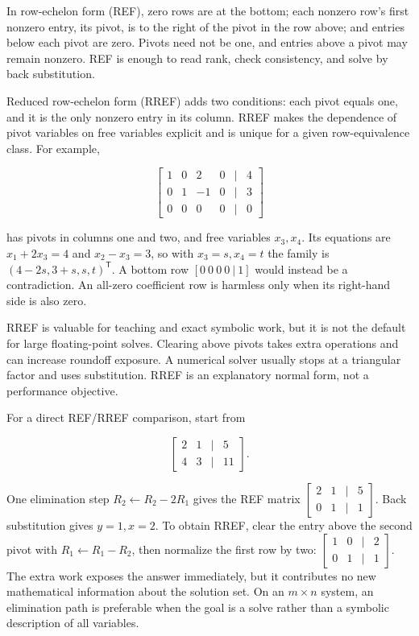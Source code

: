 \hypertarget{01-foundations-i-ch019-ref-and-rref-expose-pivots-and-free-variables}{}

In row-echelon form (REF), zero rows are at the bottom; each nonzero row's first nonzero entry, its pivot, is to the right of the pivot in the row above; and entries below each pivot are zero. Pivots need not be one, and entries above a pivot may remain nonzero. REF is enough to read rank, check consistency, and solve by back substitution.

Reduced row-echelon form (RREF) adds two conditions: each pivot equals one, and it is the only nonzero entry in its column. RREF makes the dependence of pivot variables on free variables explicit and is unique for a given row-equivalence class. For example,

\[
\begin{bmatrix}1&0&2&0&|&4\\0&1&-1&0&|&3\\0&0&0&0&|&0\end{bmatrix}
\]

has pivots in columns one and two, and free variables \(x_3,x_4\). Its equations are \(x_1+2x_3=4\) and \(x_2-x_3=3\), so with \(x_3=s,x_4=t\) the family is \((4-2s,3+s,s,t)^\mathsf T\). A bottom row \([0\ 0\ 0\ 0\ |\ 1]\) would instead be a contradiction. An all-zero coefficient row is harmless only when its right-hand side is also zero.

RREF is valuable for teaching and exact symbolic work, but it is not the default for large floating-point solves. Clearing above pivots takes extra operations and can increase roundoff exposure. A numerical solver usually stops at a triangular factor and uses substitution. RREF is an explanatory normal form, not a performance objective.

For a direct REF/RREF comparison, start from

\[
\begin{bmatrix}2&1&|&5\\4&3&|&11\end{bmatrix}.
\]

One elimination step \(R_2\leftarrow R_2-2R_1\) gives the REF matrix \(\begin{bmatrix}2&1&|&5\\0&1&|&1\end{bmatrix}\). Back substitution gives \(y=1,x=2\). To obtain RREF, clear the entry above the second pivot with \(R_1\leftarrow R_1-R_2\), then normalize the first row by two: \(\begin{bmatrix}1&0&|&2\\0&1&|&1\end{bmatrix}\). The extra work exposes the answer immediately, but it contributes no new mathematical information about the solution set. On an \(m\times n\) system, an elimination path is preferable when the goal is a solve rather than a symbolic description of all variables.

